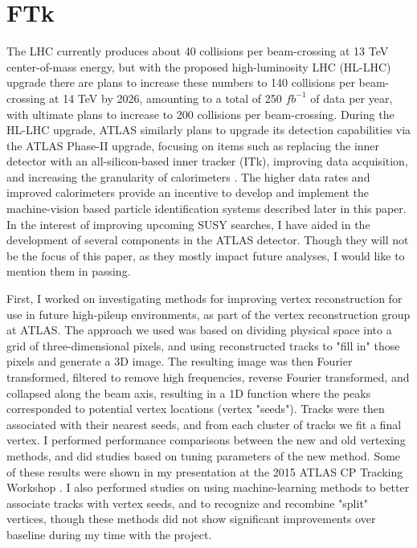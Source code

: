 \section{FTk}

The LHC currently produces about 40 collisions per beam-crossing at 13 TeV center-of-mass energy, but with the proposed high-luminosity LHC (HL-LHC) upgrade there are plans to increase these numbers to 140 collisions per beam-crossing at 14 TeV by 2026, amounting to a total of 250 $fb^{-1}$ of data per year, with ultimate plans to increase to 200 collisions per beam-crossing. During the HL-LHC upgrade, ATLAS similarly plans to upgrade its detection capabilities via the ATLAS Phase-II upgrade, focusing on items such as replacing the inner detector with an all-silicon-based inner tracker (ITk), improving data acquisition, and increasing the granularity of calorimeters \cite{ATLAS_phaseII}. The higher data rates and improved calorimeters provide an incentive to develop and implement the machine-vision based particle identification systems described later in this paper. In the interest of improving upcoming SUSY searches, I have aided in the development of several components in the ATLAS detector. Though they will not be the focus of this paper, as they mostly impact future analyses, I would like to mention them in passing.

First, I worked on investigating methods for improving vertex reconstruction for use in future high-pileup environments, as part of the vertex reconstruction group at ATLAS. The approach we used was based on dividing physical space into a grid of three-dimensional pixels, and using reconstructed tracks to "fill in" those pixels and generate a 3D image. The resulting image was then Fourier transformed, filtered to remove high frequencies, reverse Fourier transformed, and collapsed along the beam axis, resulting in a 1D function where the peaks corresponded to potential vertex locations (vertex "seeds"). Tracks were then associated with their nearest seeds, and from each cluster of tracks we fit a final vertex. I performed performance comparisons between the new and old vertexing methods, and did studies based on tuning parameters of the new method. Some of these results were shown in my presentation at the 2015 ATLAS CP Tracking Workshop \cite{vertex}. I also performed studies on using machine-learning methods to better associate tracks with vertex seeds, and to recognize and recombine "split" vertices, though these methods did not show significant improvements over baseline during my time with the project.

